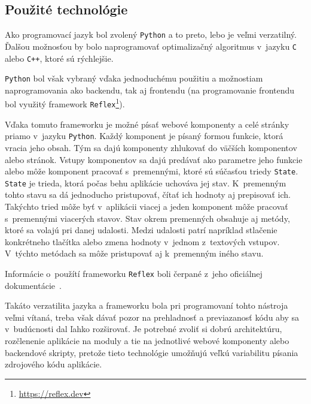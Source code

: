 \subsection*{Použité technológie}
Ako programovací jazyk bol zvolený \texttt{Python} a to preto, lebo je veľmi verzatilný.
Ďalšou možnosťou by bolo naprogramovať optimalizačný algoritmus v~jazyku \texttt{C} alebo \texttt{C++}, ktoré sú rýchlejšie.

\texttt{Python} bol však vybraný vďaka jednoduchému použitiu a možnostiam naprogramovania ako backendu, tak aj frontendu (na programovanie frontendu bol využitý framework \texttt{Reflex}\footnote{\url{https://reflex.dev}}).

Vďaka tomuto frameworku je možné písať webové komponenty a celé stránky priamo v~jazyku \texttt{Python}.
Každý komponent je písaný formou funkcie, ktorá vracia jeho obsah.
Tým sa dajú komponenty zhlukovať do väčších komponentov alebo stránok.
Vstupy komponentov sa dajú predávať ako parametre jeho funkcie alebo môže komponent pracovať s~premennými, ktoré sú súčasťou triedy \texttt{State}.
\texttt{State} je trieda, ktorá počas behu aplikácie uchováva jej stav.
K~premenným tohto stavu sa dá jednoducho pristupovať, čítať ich hodnoty aj prepisovať ich.
Takýchto tried môže byť v~aplikácii viacej a jeden komponent môže pracovať s~premennými viacerých stavov.
Stav okrem premenných obsahuje aj metódy, ktoré sa volajú pri danej udalosti.
Medzi udalosti patrí napríklad stlačenie konkrétneho tlačítka alebo zmena hodnoty v~jednom z~textových vstupov.
V~týchto metódach sa môže pristupovať aj k~premenným iného stavu.               

Informácie o~použítí frameworku \texttt{Reflex} boli čerpané z~jeho oficiálnej dokumentácie~\cite{reflex_docs}.

Takáto verzatilita jazyka a frameworku bola pri programovaní tohto nástroja veľmi vítaná,
treba však dávať pozor na prehladnosť a previazanosť kódu aby sa v~budúcnosti dal ľahko rozširovať.
Je potrebné zvoliť si dobrú architektúru, rozčlenenie aplikácie na moduly a tie na jednotlivé webové komponenty alebo backendové skripty, pretože tieto technológie umožňujú veľkú variabilitu písania zdrojového kódu aplikácie.

\newpage
